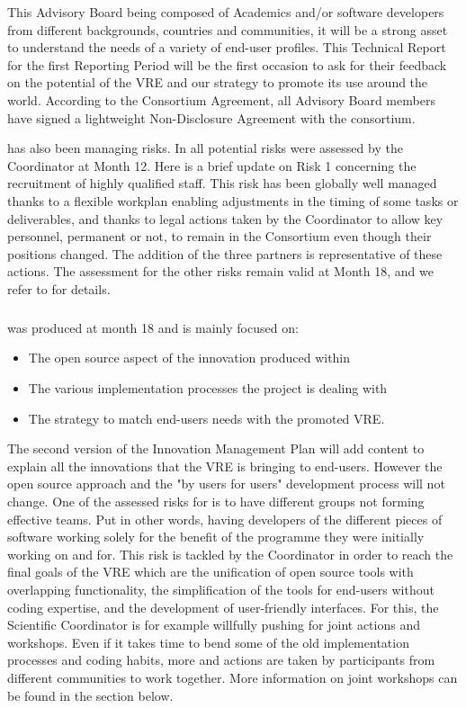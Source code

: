 This Advisory Board being composed of Academics and/or software
developers from different backgrounds, countries and communities, it
will be a strong asset to understand the needs of a variety of
end-user profiles. This Technical Report for the first Reporting
Period will be the first occasion to ask for their feedback on the
potential of the VRE and our strategy to promote its use around the
world. According to the Consortium Agreement, all Advisory Board
members have signed a lightweight Non-Disclosure Agreement with the
consortium.

 has also been managing risks. In 
all potential risks were assessed by the Coordinator at Month 12. Here
is a brief update on Risk 1 concerning the recruitment of highly
qualified staff. This risk has been globally well managed thanks to a
flexible workplan enabling adjustments in the timing of some tasks or
deliverables, and thanks to legal actions taken by the Coordinator to
allow key personnel, permanent or not, to remain in the Consortium
even though their positions changed. The addition of the three
partners is representative of these actions. The assessment for the
other risks remain valid at Month 18, and we refer to
 for details.

\subparagraph{}

 was produced at month 18 and is mainly focused on:

\begin{itemize}
\item{The open source aspect of the innovation produced within \ODK}
\item{The various implementation processes the project is dealing with}
\item{The strategy to match end-users needs with the promoted VRE}.
\end{itemize}

  The second version of the Innovation Management Plan will add content to explain all the
  innovations that the VRE is bringing to end-users. However the open source approach and
  the "by users for users" development process will not change.  One
  of the assessed risks for \ODK is to have different groups not forming effective teams. Put
  in other words, having developers of the different pieces of software working solely for
  the benefit of the programme they were initially working on and for. This risk is
  tackled by the Coordinator in order to reach the final goals of the VRE which are the
  unification of open source tools with overlapping functionality, the simplification of
  the tools for end-users without coding expertise, and the development of user-friendly
  interfaces. For this, the Scientific Coordinator is for example willfully pushing
  for joint actions and
  workshops. Even if it takes time to bend some of the old implementation processes and coding habits,
  more and actions are taken by \ODK participants from different communities to work
  together. More information on joint workshops can be found in the section below.
